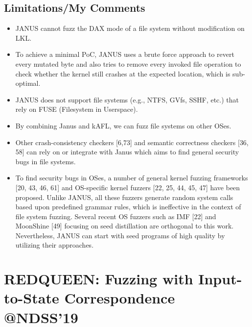 \subsection{Limitations/My Comments}
\begin{itemize}
    \item JANUS cannot fuzz the DAX mode of a file system without modification on LKL. 
    \item To achieve a minimal PoC, JANUS uses a brute force approach to revert
every mutated byte and also tries to remove every invoked
file operation to check whether the kernel still crashes at the
expected location, which is sub-optimal.
    \item JANUS does not support file systems (e.g., NTFS, GVfs, SSHF, etc.)
that rely on FUSE (Filesystem in Userspace).
    \item By combining Janus and kAFL, we can fuzz file systems on other OSes.
    \item Other crash-consistency checkers [6,73] and semantic correctness checkers [36, 58] can rely on or integrate with Janus which aims to find general security bugs in file systems.
    \item To find security bugs in OSes, a number
    of general kernel fuzzing frameworks [20, 43, 46, 61] and
    OS-specific kernel fuzzers [22, 25, 44, 45, 47] have been
    proposed. Unlike JANUS, all these fuzzers generate random
    system calls based upon predefined grammar rules, which is
    ineffective in the context of file system fuzzing. Several recent
    OS fuzzers such as IMF [22] and MoonShine [49] focusing
    on seed distillation are orthogonal to this work. Nevertheless,
    JANUS can start with seed programs of high quality by utilizing
    their approaches.
\end{itemize}
\newpage

\section{REDQUEEN: Fuzzing with Input-to-State Correspondence @NDSS'19}
